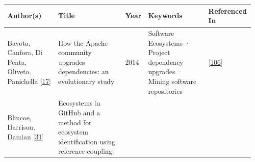 \documentclass[]{book}
\begin{document}
\begin{longtable}[]{@{}lllll@{}}
\toprule
\begin{minipage}[b]{0.12\columnwidth}\raggedright\strut
Author(s)\strut
\end{minipage} & \begin{minipage}[b]{0.31\columnwidth}\raggedright\strut
Title\strut
\end{minipage} & \begin{minipage}[b]{0.02\columnwidth}\raggedright\strut
Year\strut
\end{minipage} & \begin{minipage}[b]{0.24\columnwidth}\raggedright\strut
Keywords\strut
\end{minipage} & \begin{minipage}[b]{0.16\columnwidth}\raggedright\strut
Referenced In\strut
\end{minipage}\tabularnewline
\midrule
\endhead
\begin{minipage}[t]{0.12\columnwidth}\raggedright\strut
Bavota, Canfora, Di Penta, Oliveto, Panichella
{[}\protect\hyperlink{ref-Bavota2014}{17}{]}\strut
\end{minipage} & \begin{minipage}[t]{0.31\columnwidth}\raggedright\strut
How the Apache community upgrades dependencies: an evolutionary
study\strut
\end{minipage} & \begin{minipage}[t]{0.02\columnwidth}\raggedright\strut
2014\strut
\end{minipage} & \begin{minipage}[t]{0.24\columnwidth}\raggedright\strut
Software Ecosystems · Project dependency upgrades · Mining software
repositories\strut
\end{minipage} & \begin{minipage}[t]{0.16\columnwidth}\raggedright\strut
{[}\protect\hyperlink{ref-Kula2017}{106}{]}\strut
\end{minipage}\tabularnewline
\begin{minipage}[t]{0.12\columnwidth}\raggedright\strut
Blincoe, Harrison, Damian
{[}\protect\hyperlink{ref-Blincoe2015}{31}{]}\strut
\end{minipage} & \begin{minipage}[t]{0.31\columnwidth}\raggedright\strut
Ecosystems in GitHub and a method for ecosystem identification using
reference coupling.\strut
\end{minipage} & \begin{minipage}[t]{0.02\columnwidth}\raggedright\strut

\end{minipage}
\end{longtable}
\end{document}
